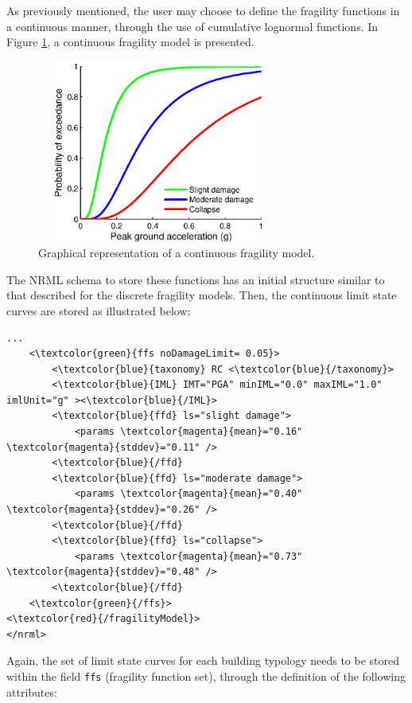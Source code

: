 As previously mentioned, the user may choose to define the \glspl{fragility function} in a continuous manner, through the use of cumulative lognormal functions. In Figure \ref{fig:fragModelContinuous}, a continuous fragility model is presented.

\begin{figure}[ht]
\centering
\includegraphics[width=8cm,height=6cm]{./figures/risk/ConFragilityModel.eps}
\caption{Graphical representation of a continuous fragility model.}
\label{fig:fragModelContinuous}
\end{figure}

The NRML schema to store these functions has an initial structure similar to that described for the discrete \glspl{fragility model}. Then, the continuous limit state curves are stored as illustrated below:

\begin{Verbatim}[frame=single, commandchars=\\\{\}, samepage=true]
    ...  
    <\textcolor{green}{ffs noDamageLimit= 0.05}> 
        <\textcolor{blue}{taxonomy} RC <\textcolor{blue}{/taxonomy}>
        <\textcolor{blue}{IML} IMT="PGA" minIML="0.0" maxIML="1.0" imlUnit="g" ><\textcolor{blue}{/IML}>
        <\textcolor{blue}{ffd} ls="slight damage">
            <params \textcolor{magenta}{mean}="0.16" \textcolor{magenta}{stddev}="0.11" />
        <\textcolor{blue}{/ffd}
        <\textcolor{blue}{ffd} ls="moderate damage">
            <params \textcolor{magenta}{mean}="0.40" \textcolor{magenta}{stddev}="0.26" />
        <\textcolor{blue}{/ffd}
        <\textcolor{blue}{ffd} ls="collapse">
            <params \textcolor{magenta}{mean}="0.73" \textcolor{magenta}{stddev}="0.48" />
        <\textcolor{blue}{/ffd}      
    <\textcolor{green}{/ffs}> 
<\textcolor{red}{/fragilityModel}>
</nrml>        
\end{Verbatim}

Again, the set of limit state curves for each building typology needs to be stored within the field \Verb+ffs+ (fragility function set), through the definition of the following attributes:

